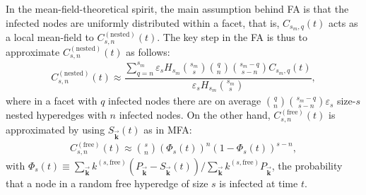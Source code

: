 \documentclass[aps,pre,twocolumn,nofootinbib,superscriptaddress,showpacs,showkeys]{revtex4-1}
\begin{document}
In the mean-field-theoretical spirit, the main assumption behind FA is that the infected nodes are uniformly distributed within a facet, that is, $C_{s_{m},q}(t)$ acts as a local mean-field to $C^{(\mathrm{nested})}_{s,n}(t)$.
The key step in the FA is thus to approximate 
$C^{(\mathrm{nested})}_{s,n}(t)$ as follows:
\begin{equation}
\begin{array}{ll}
C^{(\mathrm{nested})}_{s,n}(t)\approx\dfrac{\sum\limits_{q=n}^{s_m} \varepsilon_s H_{s_m}{s_m \choose s}{q \choose n}{s_m-q \choose s-n}C_{s_m,q}(t)}{\varepsilon_s H_{s_m}{s_m \choose s}},
\label{eq:eqin}
\end{array}
\end{equation}
where in a facet with $q$ infected nodes there are on average ${q \choose n}{s_m-q \choose s-n}\varepsilon_s$ size-$s$ nested hyperedges with $n$ infected nodes.   
On the other hand, $C^{(\mathrm{free})}_{s,n}(t)$ is approximated by using $S_{\vec{\mathbf{k}}}(t)$ as in MFA: 
\begin{equation}
\begin{array}{ll}
C^{(\mathrm{free})}_{s,n}(t)\approx \binom{s}{n}\left(\Phi_s(t)\right)^n \left(1-\Phi_s(t)\right)^{s-n},
\label{eq:eqout}
\end{array}
\end{equation}
with $\Phi_s(t)\equiv \sum_{{\vec{\mathbf{k}}}} k^{(s,\mathrm{free})}(P_{\vec{\mathbf{k}}}-S_{\vec{\mathbf{k}}}(t))/\sum_{\vec{\mathbf{k}}} k^{(s,\mathrm{free})}P_{\vec{\mathbf{k}}}$,
the probability that a node in a random free hyperedge of size $s$ is infected at time $t$.
\end{document}
